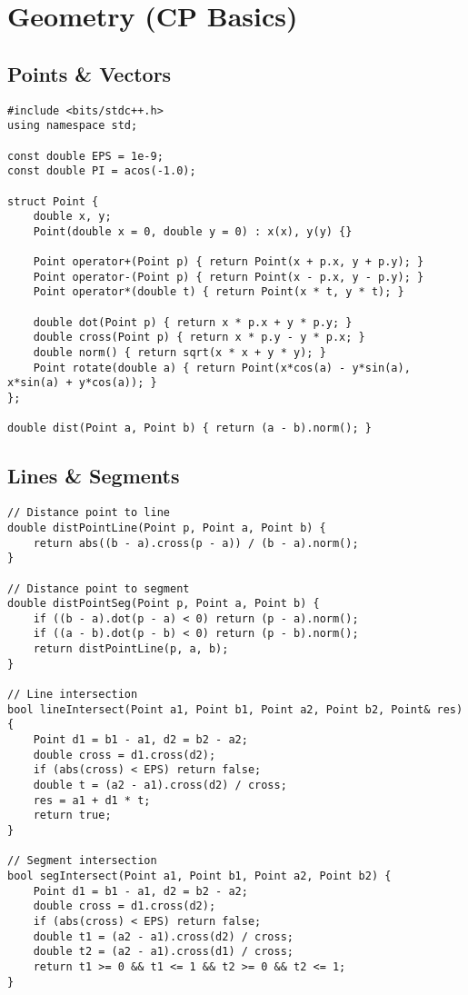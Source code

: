 \documentclass[11pt,a4paper]{article}
\begin{document}
\newpage
\section{Geometry (CP Basics)}

\subsection{Points \& Vectors}
\begin{lstlisting}[caption={Point and Vector Structure}]
#include <bits/stdc++.h>
using namespace std;

const double EPS = 1e-9;
const double PI = acos(-1.0);

struct Point {
    double x, y;
    Point(double x = 0, double y = 0) : x(x), y(y) {}
    
    Point operator+(Point p) { return Point(x + p.x, y + p.y); }
    Point operator-(Point p) { return Point(x - p.x, y - p.y); }
    Point operator*(double t) { return Point(x * t, y * t); }
    
    double dot(Point p) { return x * p.x + y * p.y; }
    double cross(Point p) { return x * p.y - y * p.x; }
    double norm() { return sqrt(x * x + y * y); }
    Point rotate(double a) { return Point(x*cos(a) - y*sin(a), x*sin(a) + y*cos(a)); }
};

double dist(Point a, Point b) { return (a - b).norm(); }
\end{lstlisting}

\newpage

\subsection{Lines \& Segments}
\begin{lstlisting}[caption={Line and Segment Operations}]
// Distance point to line
double distPointLine(Point p, Point a, Point b) {
    return abs((b - a).cross(p - a)) / (b - a).norm();
}

// Distance point to segment
double distPointSeg(Point p, Point a, Point b) {
    if ((b - a).dot(p - a) < 0) return (p - a).norm();
    if ((a - b).dot(p - b) < 0) return (p - b).norm();
    return distPointLine(p, a, b);
}

// Line intersection
bool lineIntersect(Point a1, Point b1, Point a2, Point b2, Point& res) {
    Point d1 = b1 - a1, d2 = b2 - a2;
    double cross = d1.cross(d2);
    if (abs(cross) < EPS) return false;
    double t = (a2 - a1).cross(d2) / cross;
    res = a1 + d1 * t;
    return true;
}

// Segment intersection
bool segIntersect(Point a1, Point b1, Point a2, Point b2) {
    Point d1 = b1 - a1, d2 = b2 - a2;
    double cross = d1.cross(d2);
    if (abs(cross) < EPS) return false;
    double t1 = (a2 - a1).cross(d2) / cross;
    double t2 = (a2 - a1).cross(d1) / cross;
    return t1 >= 0 && t1 <= 1 && t2 >= 0 && t2 <= 1;
}
\end{lstlisting}
\end{document}
